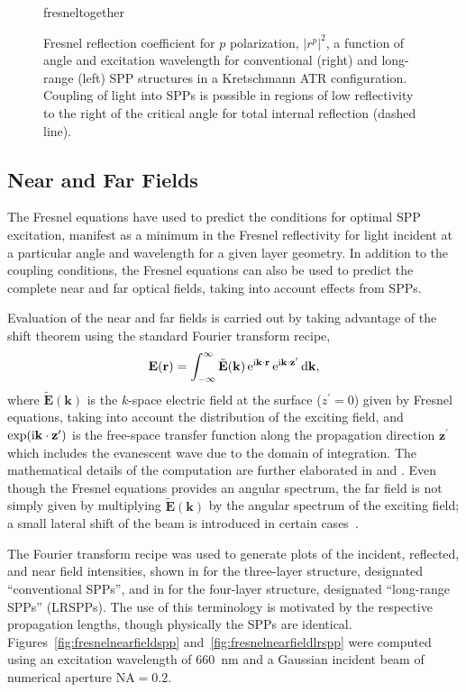 \begin{figure}[ht]
\centering
{fresneltogether}
\caption{Fresnel reflection coefficient for $p$ polarization, $|r^p|^2$, a
function of angle and excitation wavelength for conventional (right) and
long-range (left) SPP structures in a Kretschmann ATR configuration.
Coupling of light into SPPs is possible in regions of low reflectivity to the right of the
critical angle for total internal reflection (dashed line).}
\label{fig:fresnelangle}
\end{figure}

\subsection{Near and Far Fields}\label{sec:fresnelnearfar}
The Fresnel equations have used to predict the conditions for
optimal SPP excitation, manifest as a minimum in the Fresnel reflectivity
for light incident at a particular angle and wavelength for a given layer
geometry.  In addition to the coupling conditions, the Fresnel equations
can also be used to predict the complete near and far optical fields,
taking into account effects from SPPs.

Evaluation of the near and far fields is carried out by taking advantage of
the shift theorem using the standard Fourier transform recipe,
\begin{equation}
\mathbf{E}(\mathbf{r}) = \int_{-\infty}^{\infty} \tilde{\mathbf{E}}(\mathbf{k})
\,{\mathrm{e}}^{{\mathrm{i}} \mathbf{k} \cdot \mathbf{r}}
\,{\mathrm{e}}^{{\mathrm{i}} \mathbf{k} \cdot \mathbf{z}^\prime} \,\mathrm{d} \mathbf{k},
\end{equation}
where $\tilde{\mathbf{E}}(\mathbf{k})$ is the $k$-space electric field at
the surface ($z^\prime=0$) given by Fresnel equations, taking into account
the distribution of the exciting field, and $\exp({\mathrm{i}} \mathbf{k} \cdot
\mathbf{z}^\prime)$ is the free-space transfer function along the
propagation direction $\mathbf{z}^\prime$ which includes the evanescent
wave due to the domain of integration.  The mathematical details of the
computation are further elaborated in  and
.  Even though the Fresnel equations provides 
an angular spectrum, the far field is not simply given by multiplying
$\tilde{\mathbf{E}}(\mathbf{k})$ by the angular spectrum of the exciting
field; a small lateral shift of the beam is introduced in certain
cases~\cite{chuang1986lateral}.

The Fourier transform recipe was used to generate plots of the incident,
reflected, and near field intensities, shown in
 for the three-layer structure, designated
``conventional SPPs'', and in  for the
four-layer structure, designated ``long-range SPPs'' (LRSPPs).  The use of
this terminology is motivated by the respective propagation lengths,
though physically the SPPs are identical.
Figures~\ref{fig:fresnelnearfieldspp} and~\ref{fig:fresnelnearfieldlrspp}
were computed using an excitation wavelength of \SI{660}{\nano\meter}
and a Gaussian incident beam of numerical aperture $\mathrm{NA}=0.2$.

